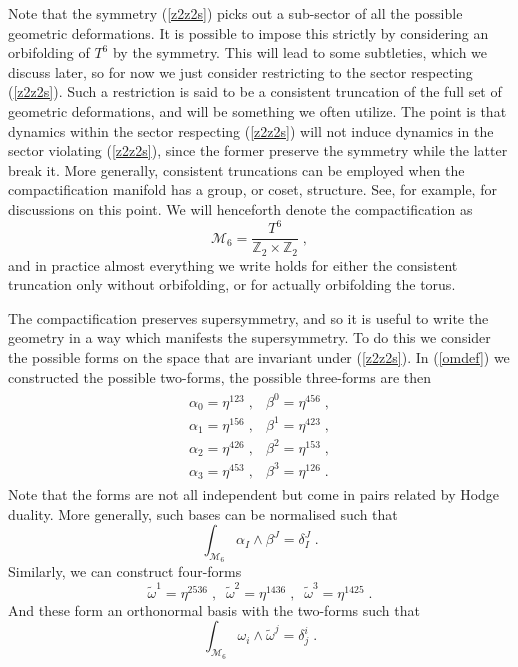 \documentclass[11pt,a4paper]{article}
\numberwithin{equation}{section}
\numberwithin{table}{section}\setlength{\multlinegap}{25pt}
\newcommand{\bea}{\begin{eqnarray}}  \newcommand{\eea}{\end{eqnarray}}
\newcommand{\cM}{\mathcal M}
\newcommand{\be}{\begin{equation}}
\newcommand{\ee}{\end{equation}}
\begin{document}
Note that the symmetry (\ref{z2z2s}) picks out a sub-sector of all the possible geometric deformations. It is possible to impose this strictly by considering an orbifolding of $T^6$ by the symmetry. This will lead to some subtleties, which we discuss later, so for now we just consider restricting to the sector respecting (\ref{z2z2s}). Such a restriction is said to be a consistent truncation of the full set of geometric deformations, and will be something we often utilize. The point is that dynamics within the sector respecting (\ref{z2z2s}) will not induce dynamics in the sector violating (\ref{z2z2s}), since the former preserve the symmetry while the latter break it. More generally, consistent truncations can be employed when the compactification manifold has a group, or coset, structure. See, for example, \cite{Camara:2005dc,Aldazabal:2007sn,Grana:2006kf,Cassani:2009ck} for discussions on this point. We will henceforth denote the compactification as
\be
\cM_6 = \frac{T^6}{\mathbb{Z}_2 \times \mathbb{Z}_2} \;,
\ee 
and in practice almost everything we write holds for either the consistent truncation only without orbifolding, or for actually orbifolding the torus.

The compactification preserves supersymmetry, and so it is useful to write the geometry in a way which manifests the supersymmetry. To do this we consider the possible forms on the space that are invariant under (\ref{z2z2s}). In (\ref{omdef}) we constructed the possible two-forms, the possible three-forms are then
\bea
\begin{array}{cc}
\alpha_0 = \eta^{123} \;,& \beta^0 = \eta^{456} \;,\\
\alpha_1 = \eta^{156} \;,& \beta^1 = \eta^{423} \;,\\
\alpha_2 = \eta^{426} \;,& \beta^2 = \eta^{153} \;,\\
\alpha_3 = \eta^{453} \;,& \beta^3 = \eta^{126} \;.
\end{array}
\eea
Note that the forms are not all independent but come in pairs related by Hodge duality. More generally, such bases can be normalised such that
\be
\int_{\cM_6} \alpha_I \wedge \beta^J = \delta_I^J \;.
\ee
Similarly, we can construct four-forms 
\be
\tilde{\omega}^1 = \eta^{2536} \;, \;\; \tilde{\omega}^2 = \eta^{1436} \;, \;\; \tilde{\omega}^3 = \eta^{1425} \;.
\ee
And these form an orthonormal basis with the two-forms such that
\be
\int_{\cM_6} \omega_i \wedge \tilde{\omega}^j = \delta^i_j \;.
\ee
 
\end{document}
